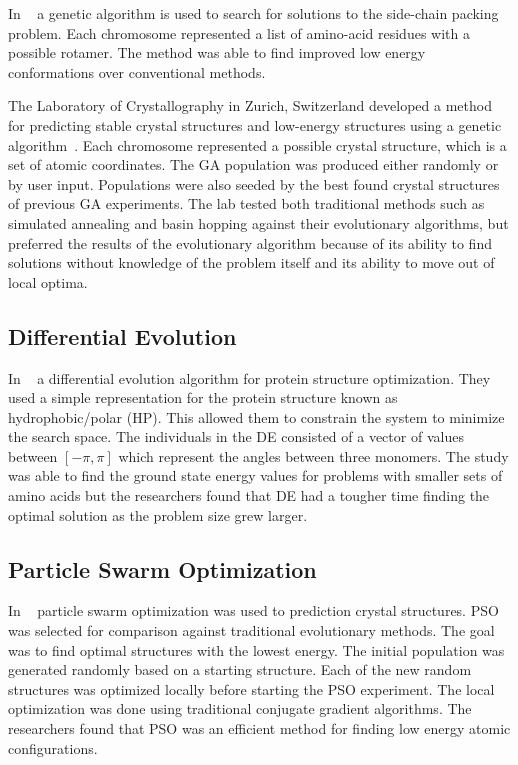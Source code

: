 In ~\cite{comte2010bio} a genetic algorithm is used to search for solutions to the side-chain packing problem. Each chromosome represented a list of amino-acid residues with a possible rotamer. The method was able to find improved low energy conformations over conventional methods.

The Laboratory of Crystallography in Zurich, Switzerland developed a method for predicting stable crystal structures and low-energy structures using a genetic algorithm~\cite{oganov2006crystal}. Each chromosome represented a possible crystal structure, which is a set of atomic coordinates. The GA population was produced either randomly or by user input. Populations were also seeded by the best found crystal structures of previous GA experiments. The lab tested both traditional methods such as simulated annealing and basin hopping against their evolutionary algorithms, but preferred the results of the evolutionary algorithm because of its ability to find solutions without knowledge of the problem itself and its ability to move out of local optima.

\subsection{Differential Evolution}

In ~\cite{kalegari2010differential} a differential evolution algorithm for protein structure optimization. They used a simple representation for the protein structure known as hydrophobic/polar (HP). This allowed them to constrain the system to minimize the search space. The individuals in the DE consisted of a vector of values between $[-\pi, \pi]$ which represent the angles between three monomers. The study was able to find the ground state energy values for problems with smaller sets of amino acids but the researchers found that DE had a tougher time finding the optimal solution as the problem size grew larger.

\subsection{Particle Swarm Optimization}

In ~\cite{wang2010crystal} particle swarm optimization was used to prediction crystal structures. PSO was selected for comparison against traditional evolutionary methods. The goal was to find optimal structures with the lowest energy. The initial population was generated randomly based on a starting structure. Each of the new random structures was optimized locally before starting the PSO experiment. The local optimization was done using traditional conjugate gradient algorithms. The researchers found that PSO was an efficient method for finding low energy atomic configurations.